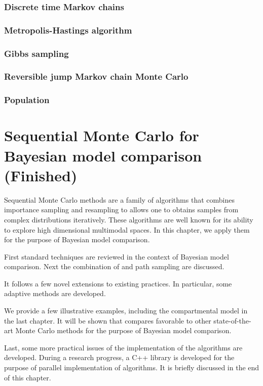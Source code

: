 \documentclass[11pt, fontset=Minion, showoverfull, toclevel=2,
bib, biblatexstyle=numeric, mintcode, minted=cache]{marticle}
\begin{document}
\subsubsection{Discrete time Markov chains}

\subsubsection{Metropolis-Hastings algorithm}

\subsubsection{Gibbs sampling}

\subsubsection{Reversible jump Markov chain Monte Carlo}

\subsubsection{Population \mcmc}

\section{Sequential Monte Carlo for Bayesian model comparison (Finished)}

Sequential Monte Carlo methods are a family of algorithms that combines
importance sampling and resampling to allows one to obtains samples from
complex distributions iteratively. These algorithms are well known for its
ability to explore high dimensional multimodal spaces. In this chapter, we
apply them for the purpose of Bayesian model comparison.

First standard techniques are reviewed in the context of Bayesian model
comparison. Next the combination of \smc and path sampling are discussed.

It follows a few novel extensions to existing practices. In particular, some
adaptive methods are developed.

We provide a few illustrative examples, including the \pet compartmental
model in the last chapter. It will be shown that \smc compares favorable to
other state-of-the-art Monte Carlo methods for the purpose of Bayesian model
comparison.

Last, some more practical issues of the implementation of the \smc algorithms
are developed. During a research progress, a C++ library is developed for the
purpose of parallel implementation of \smc algorithms. It is briefly discussed
in the end of this chapter.
\end{document}
